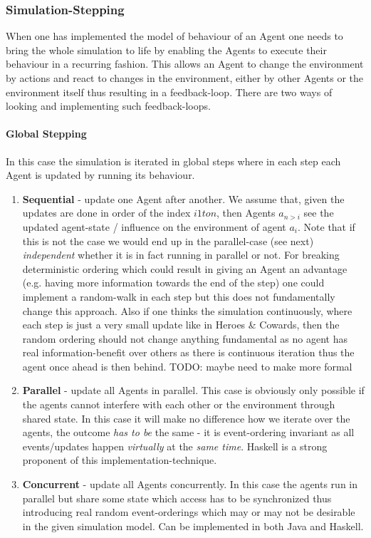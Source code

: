 \subsubsection{Simulation-Stepping}
When one has implemented the model of behaviour of an Agent one needs to bring the whole simulation to life by enabling the Agents to execute their behaviour in a recurring fashion. This allows an Agent to change the environment by actions and react to changes in the environment, either by other Agents or the environment itself thus resulting in a feedback-loop. There are two ways of looking and implementing such feedback-loops. 

\paragraph{Global Stepping}
In this case the simulation is iterated in global steps where in each step each Agent is updated by running its behaviour.

\begin{enumerate}
\item \textbf{Sequential} - update one Agent after another. We assume that, given the updates are done in order of the index $i 1 to n$, then Agents $a_{n>i}$ see the updated agent-state / influence on the environment of agent $a_i$. Note that if this is not the case we would end up in the parallel-case (see next) \textit{independent} whether it is in fact running in parallel or not. For breaking deterministic ordering which could result in giving an Agent an advantage (e.g. having more information towards the end of the step) one could implement a random-walk in each step but this does not fundamentally change this approach. Also if one thinks the simulation continuously, where each step is just a very small update like in Heroes \& Cowards, then the random ordering should not change anything fundamental as no agent has real information-benefit over others as there is continuous iteration thus the agent once ahead is then behind. TODO: maybe need to make more formal

\item \textbf{Parallel} - update all Agents in parallel. This case is obviously only possible if the agents cannot interfere with each other or the environment through shared state. In this case it will make no difference how we iterate over the agents, the outcome \textit{has to be} the same - it is event-ordering invariant as all events/updates happen \textit{virtually} at the \textit{same time}. Haskell is a strong proponent of this implementation-technique.

\item \textbf{Concurrent} - update all Agents concurrently. In this case the agents run in parallel but share some state which access has to be synchronized thus introducing real random event-orderings which may or may not be desirable in the given simulation model. Can be implemented in both Java and Haskell.
\end{enumerate}

